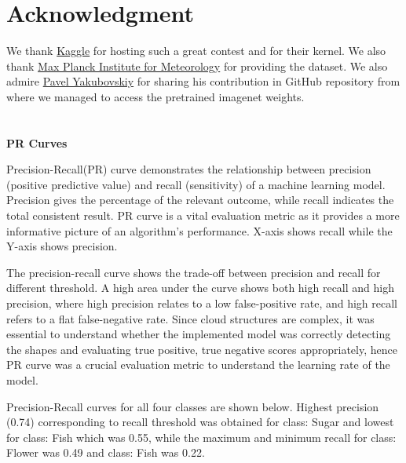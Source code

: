 \documentclass[conference]{IEEEtran}
\begin{document}
\section*{Acknowledgment}
We thank \href{https://www.kaggle.com/}{Kaggle} for hosting such a great contest and for their kernel. We also thank \href{https://www.mpimet.mpg.de/en/mpimet-homepage/}{Max Planck Institute for Meteorology} for providing the dataset. We also admire \href{https://github.com/qubvel}{Pavel Yakubovskiy} for sharing his contribution in GitHub repository from where we managed to access the pretrained imagenet weights.

 


\newpage
\clearpage
\onecolumn
\appendix 





\section{}{\textbf{PR Curves}}

Precision-Recall(PR) curve demonstrates the relationship between precision (positive predictive value) and recall (sensitivity) of a machine learning model. Precision gives the percentage of the relevant outcome, while recall indicates the total consistent result. PR curve is a vital evaluation metric as it provides a more informative picture of an algorithm's performance. X-axis shows recall while the Y-axis shows precision. 

The precision-recall curve shows the trade-off between precision and recall for different threshold. A high area under the curve shows both high recall and high precision, where high precision relates to a low false-positive rate, and high recall refers to a flat false-negative rate. Since cloud structures are complex, it was essential to understand whether the implemented model was correctly detecting the shapes and evaluating true positive, true negative scores appropriately, hence PR curve was a crucial evaluation metric to understand the learning rate of the model.

Precision-Recall curves for all four classes are shown below. Highest precision (0.74) corresponding to recall threshold was obtained for class: Sugar and lowest for class: Fish which was 0.55, while the maximum and minimum recall for class: Flower was 0.49 and class: Fish was 0.22.
\end{document}
